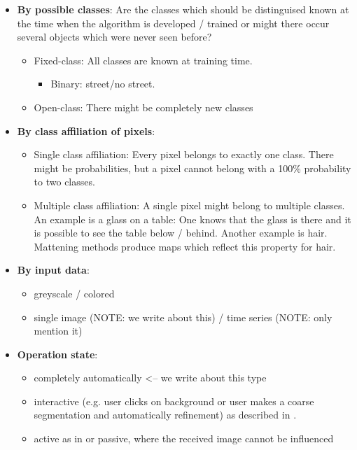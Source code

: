 \begin{itemize}
    \item \textbf{By possible classes}: Are the classes which should be distinguised
          known at the time when the algorithm is developed / trained or might
          there occur several objects which were never seen before?
          \begin{itemize}
              \item Fixed-class: All classes are known at training time.
              \begin{itemize}
                  \item Binary: street/no street.
              \end{itemize}
              \item Open-class: There might be completely new classes
          \end{itemize}
    \item \textbf{By class affiliation of pixels}:
        \begin{itemize}
            \item Single class affiliation: Every pixel belongs to exactly one class. There might
                  be probabilities, but a pixel cannot belong with a 100\%
                  probability to two classes.
            \item Multiple class affiliation: A single pixel might belong to
                  multiple classes. An example is a glass on a table: One
                  knows that the glass is there and it is possible to see the
                  table below / behind. Another example is hair. Mattening
                  methods produce maps which reflect this property for hair.\cite{levin2008spectral}
        \end{itemize}
    \item \textbf{By input data}:
          \begin{itemize}
              \item greyscale / colored
              \item single image (NOTE: we write about this) / time series (NOTE: only mention it)
          \end{itemize}
    \item \textbf{Operation state}:
        \begin{itemize}
            \item completely automatically <-- we write about this type
            \item interactive (e.g. user clicks on background or user makes a
                  coarse segmentation and automatically refinement) as
                  described in
                  \cite{protiere2007interactive,rother2004grabcut}.
            \item active as in
                  \cite{schiebener2011segmentation,schiebener2012discovery} or
                  passive, where the received image cannot be influenced
        \end{itemize}
\end{itemize}
